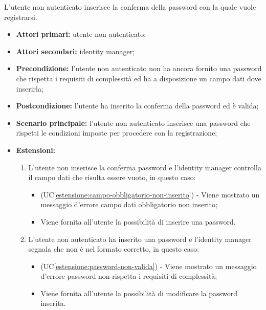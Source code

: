 L'utente non autenticato inserisce la conferma della password con la quale vuole registrarsi.
\begin{itemize}
	\item \textbf{Attori primari:} utente non autenticato;
	\item \textbf{Attori secondari:} identity manager;
	\item \textbf{Precondizione:} l'utente non autenticato non ha ancora fornito una password che rispetta i requisiti di complessità ed ha a disposizione un campo dati dove inserirla;
	\item \textbf{Postcondizione:} l'utente ha inserito la conferma della password ed è valida;
	\item \textbf{Scenario principale:} l'utente non autenticato inserisce una password che rispetti le condizioni imposte per procedere con la registrazione;
	\item \textbf{Estensioni:} 
	\begin{enumerate}[label=\lett]
		\item L'utente non inserisce la conferma password e l'identity manager controlla il campo dati che risulta essere vuoto, in questo caso:
		\begin{itemize}
			\item (UC\ref{estensione:campo-obbligatorio-non-inserito}) - Viene mostrato un messaggio d'errore campo dati obbligatorio non inserito;
			\item Viene fornita all'utente la possibilità di inserire una password.
		\end{itemize}
		\item L'utente non autenticato ha inserito una password e l'identity manager segnala che non è nel formato corretto, in questo caso:
		\begin{itemize}
			\item (UC\ref{estensione:password-non-valida}) - Viene mostrato un messaggio d'errore password non rispetta i requisiti di complessità;
			\item Viene fornita all'utente la possibilità di modificare la password inserita.
		\end{itemize}
	\end{enumerate} 
\end{itemize}

\label{autenticazione-venditore}


